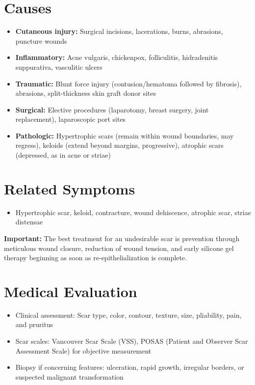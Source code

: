 \section*{Causes}
\begin{itemize}
  \item \textbf{Cutaneous injury:} Surgical incisions, lacerations, burns, abrasions, puncture wounds
  \item \textbf{Inflammatory:} Acne vulgaris, chickenpox, folliculitis, hidradenitis suppurativa, vasculitic ulcers
  \item \textbf{Traumatic:} Blunt force injury (contusion/hematoma followed by fibrosis), abrasions, split-thickness skin graft donor sites
  \item \textbf{Surgical:} Elective procedures (laparotomy, breast surgery, joint replacement), laparoscopic port sites
  \item \textbf{Pathologic:} Hypertrophic scars (remain within wound boundaries, may regress), keloids (extend beyond margins, progressive), atrophic scars (depressed, as in acne or striae)
\end{itemize}

\section*{Related Symptoms}
\begin{itemize}
  \item Hypertrophic scar, keloid, contracture, wound dehiscence, atrophic scar, striae distensae
\end{itemize}
\textbf{Important:} The best treatment for an undesirable scar is prevention through meticulous wound closure, reduction of wound tension, and early silicone gel therapy beginning as soon as re-epithelialization is complete.

\section*{Medical Evaluation}
\begin{itemize}
  \item Clinical assessment: Scar type, color, contour, texture, size, pliability, pain, and pruritus
  \item Scar scales: Vancouver Scar Scale (VSS), POSAS (Patient and Observer Scar Assessment Scale) for objective measurement
  \item Biopsy if concerning features: ulceration, rapid growth, irregular borders, or suspected malignant transformation
\end{itemize}

